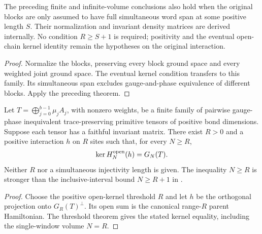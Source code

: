 \begin{lemma}
    \label{thm:original_family_eventual_kernel_pure_ground_state_gap}
    \leanok
    The preceding finite and infinite-volume conclusions also hold when
    the original blocks are only assumed to have full simultaneous word
    span at some positive length $S$. Their normalization and invariant
    density matrices are derived internally. No condition $R\geq S+1$
    is required; positivity and the eventual open-chain kernel identity
    remain the hypotheses on the original interaction.
\end{lemma}
\begin{proof}\leanok
    Normalize the blocks, preserving every block ground space and every
    weighted joint ground space. The eventual kernel condition transfers
    to this family. Its simultaneous span excludes gauge-and-phase
    equivalence of different blocks. Apply the preceding theorem.
\end{proof}

\begin{lemma}
    \label{thm:primitive_ground_state_interaction_exists}
    \leanok
    Let $T=\bigoplus_{j=0}^{b-1}\mu_jA_j$, with nonzero weights, be a finite
    family of pairwise gauge-phase inequivalent trace-preserving primitive
    tensors of positive bond dimensions. Suppose each tensor has a faithful
    invariant matrix. There exist $R>0$ and a positive interaction $h$ on
    $R$ sites such that, for every $N\geq R$,
    \begin{align}
        \ker H_N^{\mathrm{open}}(h)=G_N(T).
        \notag
    \end{align}
    Neither $R$ nor a simultaneous injectivity length is given.
    The inequality $N\geq R$ is stronger than the inclusive-interval bound
    $N\geq R+1$ in
    \cite[Theorem~1.1]{Nachtergaele1996Spectral}.
\end{lemma}
\begin{proof}\leanok
    Choose the positive open-kernel threshold $R$ and let $h$ be the
    orthogonal projection onto $G_R(T)^\perp$. Its open sum is the canonical
    range-$R$ parent Hamiltonian. The threshold theorem gives the stated
    kernel equality, including the single-window volume $N=R$.
\end{proof}

